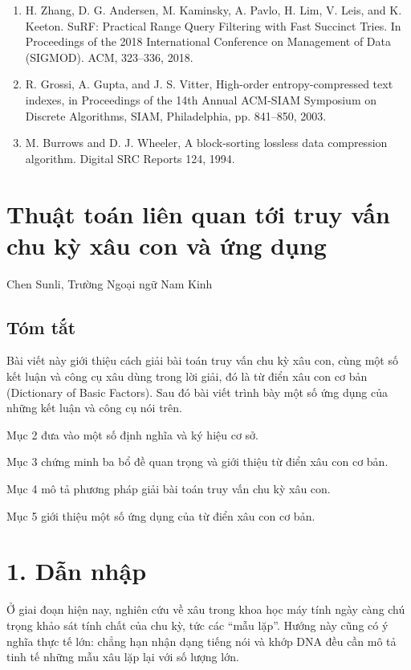 \documentclass[11pt]{article}
\begin{document}
\begin{enumerate}
        Automata, Languages and Programming (ICALP). 451--462, 2009.
  \item H. Zhang, D. G. Andersen, M. Kaminsky, A. Pavlo, H. Lim, V. Leis, and
        K. Keeton. SuRF: Practical Range Query Filtering with Fast Succinct
        Tries. In Proceedings of the 2018 International Conference on
        Management of Data (SIGMOD). ACM, 323--336, 2018.
  \item R. Grossi, A. Gupta, and J. S. Vitter, High-order entropy-compressed
        text indexes, in Proceedings of the 14th Annual ACM-SIAM Symposium on
        Discrete Algorithms, SIAM, Philadelphia, pp. 841--850, 2003.
  \item M. Burrows and D. J. Wheeler, A block-sorting lossless data compression
        algorithm. Digital SRC Reports 124, 1994.
\end{enumerate}

\clearpage
\section*{Thuật toán liên quan tới truy vấn chu kỳ xâu con và ứng dụng}

\begin{center}
Chen Sunli, Trường Ngoại ngữ Nam Kinh
\end{center}

\subsection*{Tóm tắt}

Bài viết này giới thiệu cách giải bài toán truy vấn chu kỳ xâu con, cùng một
số kết luận và công cụ xâu dùng trong lời giải, đó là từ điển xâu con cơ bản
(Dictionary of Basic Factors). Sau đó bài viết trình bày một số ứng dụng của
những kết luận và công cụ nói trên.

Mục 2 đưa vào một số định nghĩa và ký hiệu cơ sở.

Mục 3 chứng minh ba bổ đề quan trọng và giới thiệu từ điển xâu con cơ bản.

Mục 4 mô tả phương pháp giải bài toán truy vấn chu kỳ xâu con.

Mục 5 giới thiệu một số ứng dụng của từ điển xâu con cơ bản.

\section*{1. Dẫn nhập}

Ở giai đoạn hiện nay, nghiên cứu về xâu trong khoa học máy tính ngày càng chú
trọng khảo sát tính chất của chu kỳ, tức các ``mẫu lặp''. Hướng này cũng có ý
nghĩa thực tế lớn: chẳng hạn nhận dạng tiếng nói và khớp DNA đều cần mô tả
tinh tế những mẫu xâu lặp lại với số lượng lớn.
\end{document}
